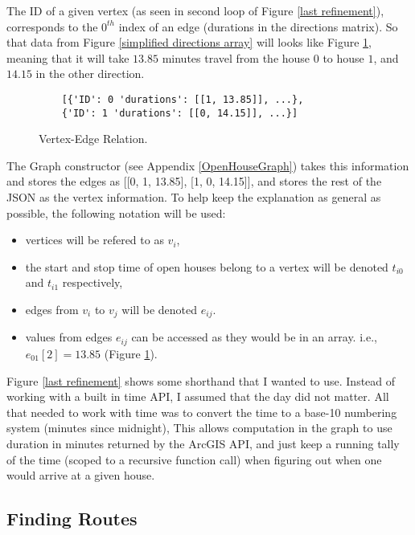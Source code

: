 \documentclass[letterpaper,11pt]{report}
\theoremstyle{definition}
\theoremstyle{definition}
\def\ie{{i.e.,}\ }
\begin{document}
The \textsf{ID} of a given vertex (as seen in second loop of Figure \ref{last refinement}), corresponds to the $0^{th}$ index of an \textsf{edge} (\textsf{durations} in the directions matrix). So that data from Figure \ref{simplified directions array} will looks like Figure \ref{vertex edge relation}, meaning that it will take $13.85$ minutes travel from the house $0$ to house $1$, and $14.15$ in the other direction.
\begin{figure}[!htb]
  \begin{lstlisting}
    [{'ID': 0 'durations': [[1, 13.85]], ...}, 
    {'ID': 1 'durations': [[0, 14.15]], ...}]
  \end{lstlisting}
  \caption{Vertex-Edge Relation.}\label{vertex edge relation}
\end{figure}

The \textsf{Graph} constructor (see Appendix \ref{OpenHouseGraph}) takes this information and stores the edges as [[0, 1, 13.85], [1, 0, 14.15]], and stores the rest of the JSON as the vertex information. To help keep the explanation as general as possible, the following notation will be used:
\begin{itemize}
  \item vertices will be refered to as $v_i$,
  \item the start and stop time of open houses belong to a vertex will be denoted $t_{i0}$ and $t_{i1}$ respectively,
  \item edges from $v_i$ to $v_j$ will be denoted $e_{ij}$.
  \item values from edges $e_{ij}$ can be accessed as they would be in an array. \ie $e_{01}[2] = 13.85$ (Figure \ref{vertex edge relation}).
\end{itemize}

Figure \ref{last refinement} shows some shorthand that I wanted to use. Instead of working with a built in time API, I assumed that the day did not matter. All that needed to work with time was to convert the time to a base-10 numbering system (minutes since midnight), This allows computation in the graph to use duration in minutes returned by the ArcGIS API, and just keep a running tally of the time (scoped to a recursive function call) when figuring out when one would arrive at a given house.
 
\subsection{Finding Routes}
\end{document}

